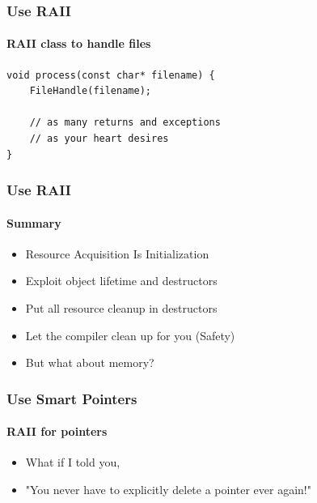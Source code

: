 \documentclass[table]{beamer}
\newcounter{rulecount}
\newcommand{\declarerule}{\textbf{\color{themeblue}{Rule \therulecount:}} }
\begin{document}
\begin{frame}[fragile]
    \frametitle{\declarerule Use RAII}
    \framesubtitle{RAII class to handle files}
    \begin{lstlisting}[title=Problems begone!]
void process(const char* filename) {
    FileHandle(filename);

    // as many returns and exceptions
    // as your heart desires
}
    \end{lstlisting}
\end{frame}

\begin{frame}
    \frametitle{\declarerule Use RAII}
    \framesubtitle{Summary}
    \begin{itemize}
        \item<1->Resource Acquisition Is Initialization 
        \item<1->Exploit object lifetime and destructors
        \item<1->Put all resource cleanup in destructors
        \item<1->Let the compiler clean up for you (\alert{Safety})
        \item<2->But what about memory?
    \end{itemize}
\end{frame}


\begin{frame}
    \frametitle{\declarerule Use Smart Pointers}
    \framesubtitle{RAII for pointers}
    \begin{itemize}
        \item What if I told you,
        \item "You never have to explicitly delete a pointer ever again!"
    \end{itemize}
\end{frame}




\end{document}
